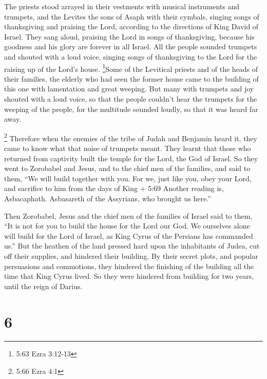  The priests stood arrayed in their vestments with musical
instruments and trumpets, and the Levites the sons of Asaph with their
cymbals,  singing songs of thanksgiving and praising the
Lord, according to the directions of King David of Israel. 
They sang aloud, praising the Lord in songs of thanksgiving, because his
goodness and his glory are forever in all Israel.  All the
people sounded trumpets and shouted with a loud voice, singing songs of
thanksgiving to the Lord for the raising up of the Lord's house.
 \footnote{5:63 Ezra 3:12-13}Some of the Levitical priests
and of the heads of their families, the elderly who had seen the former
house came to the building of this one with lamentation and great
weeping.  But many with trumpets and joy shouted with a
loud voice,  so that the people couldn't hear the trumpets
for the weeping of the people, for the multitude sounded loudly, so that
it was heard far away.

 \footnote{5:66 Ezra 4:1} Therefore when the enemies of the
tribe of Judah and Benjamin heard it, they came to know what that noise
of trumpets meant.  They learnt that those who returned
from captivity built the temple for the Lord, the God of Israel.
 So they went to Zorobabel and Jesus, and to the chief men
of the families, and said to them, ``We will build together with you.
 For we, just like you, obey your Lord, and sacrifice to
him from the days of King + 5:69 Another reading is, Asbacaphath.
Asbasareth of the Assyrians, who brought us here.''

 Then Zorobabel, Jesus and the chief men of the families of
Israel said to them, ``It is not for you to build the house for the Lord
our God.  We ourselves alone will build for the Lord of
Israel, as King Cyrus of the Persians has commanded us.'' 
But the heathen of the land pressed hard upon the inhabitants of Judea,
cut off their supplies, and hindered their building.  By
their secret plots, and popular persuasions and commotions, they
hindered the finishing of the building all the time that King Cyrus
lived. So they were hindered from building for two years, until the
reign of Darius.

\hypertarget{section-5}{%
\section{6}\label{section-5}}

